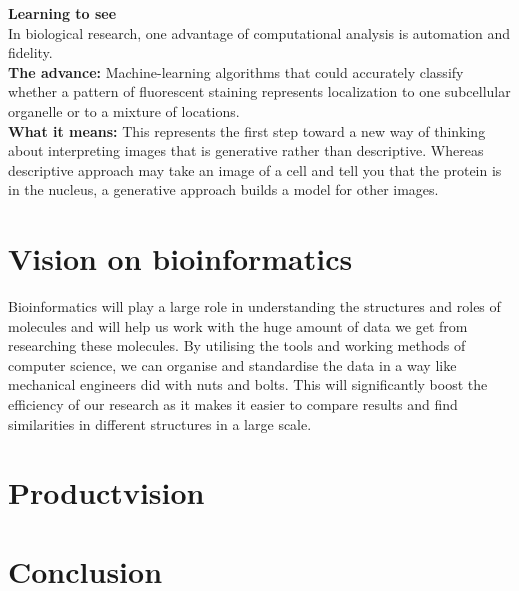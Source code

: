 \documentclass[10pt,a4paper]{report}
\begin{document}
	\textbf{Learning to see}\\
	In biological research, one advantage of computational analysis is automation and fidelity.\\
	\textbf{The advance:} Machine-learning algorithms that could accurately classify whether a pattern of fluorescent staining represents localization to one subcellular organelle or to a mixture of locations.\\
	\textbf{What it means:} This represents the first step toward a new way of thinking about interpreting images that is generative rather than descriptive.
	Whereas descriptive approach may take an image of a cell and tell you that the protein is in the nucleus, a generative approach builds a model for other images.
	
	\newpage
	\section{Vision on bioinformatics}
		Bioinformatics will play a large role in understanding the structures and roles of molecules and will help us work with the huge amount of data we get from researching these molecules. By utilising the tools and working methods of computer science, we can organise and standardise the data in a way like mechanical engineers did with nuts and bolts. This will significantly boost the efficiency of our research as it makes it easier to compare results and find similarities in different structures in a large scale.
	
	\section{Productvision}
	
	\section{Conclusion}
	
	
\end{document}
